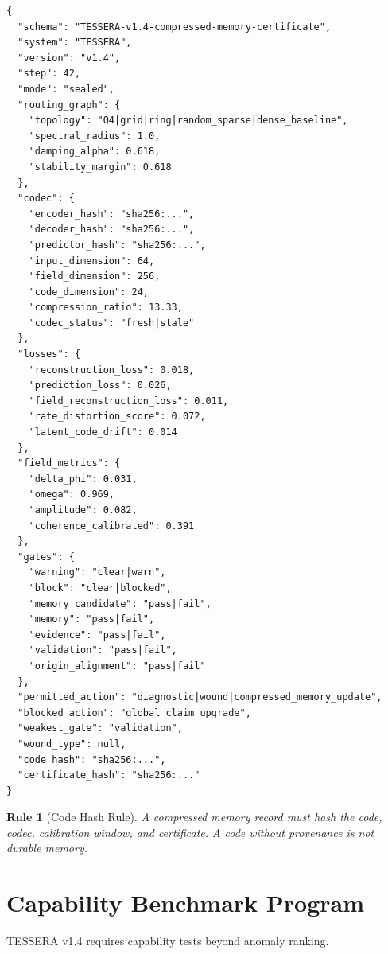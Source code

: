 \documentclass[12pt]{article}
\newtheorem{rulebox}{Rule}
\begin{document}
\begin{lstlisting}
{
  "schema": "TESSERA-v1.4-compressed-memory-certificate",
  "system": "TESSERA",
  "version": "v1.4",
  "step": 42,
  "mode": "sealed",
  "routing_graph": {
    "topology": "Q4|grid|ring|random_sparse|dense_baseline",
    "spectral_radius": 1.0,
    "damping_alpha": 0.618,
    "stability_margin": 0.618
  },
  "codec": {
    "encoder_hash": "sha256:...",
    "decoder_hash": "sha256:...",
    "predictor_hash": "sha256:...",
    "input_dimension": 64,
    "field_dimension": 256,
    "code_dimension": 24,
    "compression_ratio": 13.33,
    "codec_status": "fresh|stale"
  },
  "losses": {
    "reconstruction_loss": 0.018,
    "prediction_loss": 0.026,
    "field_reconstruction_loss": 0.011,
    "rate_distortion_score": 0.072,
    "latent_code_drift": 0.014
  },
  "field_metrics": {
    "delta_phi": 0.031,
    "omega": 0.969,
    "amplitude": 0.082,
    "coherence_calibrated": 0.391
  },
  "gates": {
    "warning": "clear|warn",
    "block": "clear|blocked",
    "memory_candidate": "pass|fail",
    "memory": "pass|fail",
    "evidence": "pass|fail",
    "validation": "pass|fail",
    "origin_alignment": "pass|fail"
  },
  "permitted_action": "diagnostic|wound|compressed_memory_update",
  "blocked_action": "global_claim_upgrade",
  "weakest_gate": "validation",
  "wound_type": null,
  "code_hash": "sha256:...",
  "certificate_hash": "sha256:..."
}
\end{lstlisting}

\begin{rulebox}[Code Hash Rule]
A compressed memory record must hash the code, codec, calibration window, and
certificate. A code without provenance is not durable memory.
\end{rulebox}

\section{Capability Benchmark Program}

TESSERA v1.4 requires capability tests beyond anomaly ranking.
\end{document}
